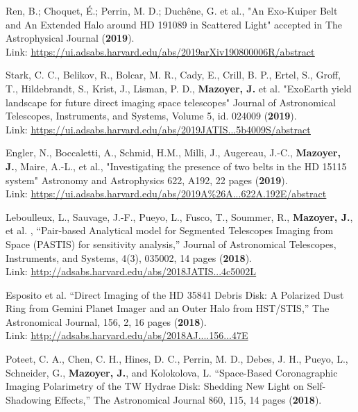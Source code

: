 \documentclass[12pt]{article}
\begin{document}
\begin{etaremune}
\item Ren, B.; Choquet, É.; Perrin, M. D.; Duchêne, G. et al., "An Exo-Kuiper Belt and An Extended Halo around HD 191089 in Scattered Light"
accepted in The Astrophysical Journal (\textbf{2019}).\\
Link: \textcolor{BrickRed}{\underline{\url{https://ui.adsabs.harvard.edu/abs/2019arXiv190800006R/abstract }}}
\item Stark, C. C., Belikov, R., Bolcar, M. R., Cady, E., Crill, B. P., Ertel, S., Groff, T., Hildebrandt, S., Krist, J., Lisman, P. D., \textbf{Mazoyer, J.} et al.
"ExoEarth yield landscape for future direct imaging space telescopes"
Journal of Astronomical Telescopes, Instruments, and Systems, Volume 5, id. 024009 (\textbf{2019}).\\
Link: \textcolor{BrickRed}{\underline{\url{https://ui.adsabs.harvard.edu/abs/2019JATIS...5b4009S/abstract}}}
\item Engler, N., Boccaletti, A., Schmid, H.M., Milli, J., Augereau, J.-C., \textbf{Mazoyer, J.}, Maire, A.-L., et al., "Investigating the presence of two belts in the HD 15115 system"
Astronomy and Astrophysics 622, A192, 22 pages (\textbf{2019}).\\
Link: \textcolor{BrickRed}{\underline{\url{https://ui.adsabs.harvard.edu/abs/2019A\%26A...622A.192E/abstract}}}
\item Leboulleux, L., Sauvage, J.-F., Pueyo, L.,  Fusco, T., Soummer, R., \textbf{Mazoyer, J.}, et al. , “Pair-based Analytical model for Segmented Telescopes Imaging from Space (PASTIS) for sensitivity analysis,” Journal of Astronomical Telescopes, Instruments, and Systems, 4(3), 035002, 14 pages  (\textbf{2018}).\\
Link: \textcolor{BrickRed}{\underline{\url{http://adsabs.harvard.edu/abs/2018JATIS...4c5002L}}}
\item Esposito et al. “Direct Imaging of the HD 35841 Debris Disk: A Polarized Dust Ring from Gemini Planet Imager and an Outer Halo from HST/STIS,” The Astronomical Journal, 156, 2, 16 pages (\textbf{2018}).\\
Link: \textcolor{BrickRed}{\underline{\url{http://adsabs.harvard.edu/abs/2018AJ....156...47E}}}
\item Poteet, C. A., Chen, C. H., Hines, D. C., Perrin, M. D., Debes, J. H., Pueyo, L., Schneider, G., \textbf{Mazoyer, J.}, and Kolokolova, L. “Space-Based Coronagraphic Imaging Polarimetry of the TW Hydrae Disk: Shedding New Light on Self-Shadowing Effects,” The Astronomical Journal 860, 115, 14 pages (\textbf{2018}).\\

\end{etaremune}
\end{document}
